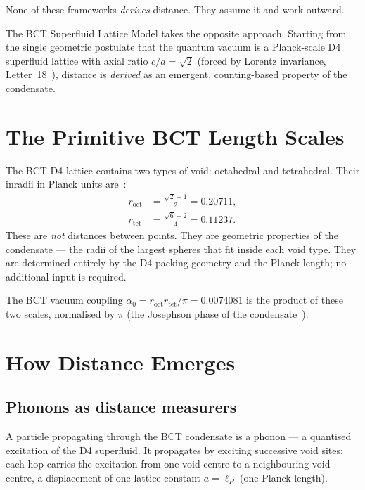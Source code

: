 \documentclass[aps,prl,twocolumn,showpacs,preprintnumbers]{revtex4-2}
\newcommand{\roct}{r_{\mathrm{oct}}}
\newcommand{\rtet}{r_{\mathrm{tet}}}
\newcommand{\azero}{\alpha_0}
\newcommand{\lP}{\ell_P}
\begin{document}
None of these frameworks \emph{derives} distance.
They assume it and work outward.

The BCT Superfluid Lattice Model takes the opposite approach.
Starting from the single geometric postulate that the quantum
vacuum is a Planck-scale D4 superfluid lattice with axial ratio
$c/a = \sqrt{2}$ (forced by Lorentz invariance, Letter~18~\cite{letter18}),
distance is \emph{derived} as an emergent, counting-based property
of the condensate.

\section{The Primitive BCT Length Scales}

The BCT D4 lattice contains two types of void: octahedral and
tetrahedral. Their inradii in Planck units are~\cite{letter1}:
\begin{align}
  \roct &= \frac{\sqrt{2}-1}{2} = 0.20711,
  \label{eq:roct}\\
  \rtet &= \frac{\sqrt{6}-2}{4} = 0.11237.
  \label{eq:rtet}
\end{align}
These are \emph{not} distances between points. They are geometric
properties of the condensate --- the radii of the largest spheres
that fit inside each void type. They are determined entirely by
the D4 packing geometry and the Planck length; no additional
input is required.

The BCT vacuum coupling $\azero = \roct\rtet/\pi = 0.0074081$
is the product of these two scales, normalised by $\pi$ (the
Josephson phase of the condensate~\cite{letter27}).

\section{How Distance Emerges}

\subsection{Phonons as distance measurers}

A particle propagating through the BCT condensate is a phonon ---
a quantised excitation of the D4 superfluid. It propagates by
exciting successive void sites: each hop carries the excitation
from one void centre to a neighbouring void centre, a displacement
of one lattice constant $a = \lP$ (one Planck length).
\end{document}
